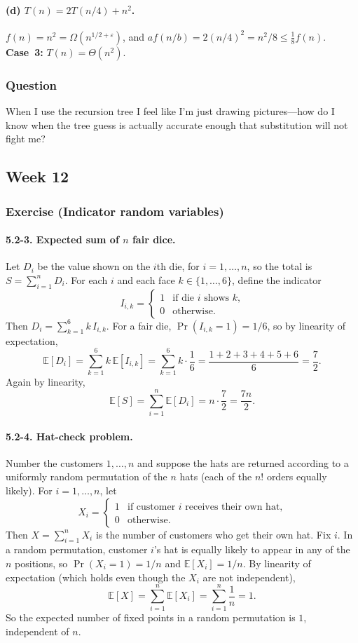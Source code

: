 \documentclass{article}
\theoremstyle{theorem}
\theoremstyle{definition}
\theoremstyle{remark}
\begin{document}
\paragraph{(d) $T(n)=2T(n/4)+n^2$.}
$f(n)=n^2=\Omega(n^{1/2+\varepsilon})$, and $af(n/b)=2(n/4)^2=n^2/8\le \tfrac18 f(n)$. \textbf{Case~3:} $T(n)=\Theta(n^2)$.

\subsubsection*{Question}
When I use the recursion tree I feel like I'm just drawing pictures---how do I know when the tree guess is actually accurate enough that substitution will not fight me?

\subsection{Week 12}\label{sec:week12}

\subsubsection*{Exercise (Indicator random variables)}

\paragraph{5.2-3. Expected sum of $n$ fair dice.}
Let $D_i$ be the value shown on the $i$th die, for $i=1,\ldots,n$, so the total is $S=\sum_{i=1}^n D_i$.
For each $i$ and each face $k\in\{1,\ldots,6\}$, define the indicator
\[
I_{i,k}=
\begin{cases}
1 & \text{if die $i$ shows $k$,}\\
0 & \text{otherwise.}
\end{cases}
\]
Then $D_i=\sum_{k=1}^6 k\,I_{i,k}$. For a fair die, $\Pr(I_{i,k}=1)=1/6$, so by linearity of expectation,
\[
\mathbb{E}[D_i]=\sum_{k=1}^6 k\,\mathbb{E}[I_{i,k}]
=\sum_{k=1}^6 k\cdot\frac{1}{6}
=\frac{1+2+3+4+5+6}{6}
=\frac{7}{2}.
\]
Again by linearity,
\[
\mathbb{E}[S]=\sum_{i=1}^n \mathbb{E}[D_i]=n\cdot\frac{7}{2}=\frac{7n}{2}.
\]

\paragraph{5.2-4. Hat-check problem.}
Number the customers $1,\ldots,n$ and suppose the hats are returned according to a uniformly random permutation of the $n$ hats (each of the $n!$ orders equally likely).
For $i=1,\ldots,n$, let
\[
X_i=
\begin{cases}
1 & \text{if customer $i$ receives their own hat,}\\
0 & \text{otherwise.}
\end{cases}
\]
Then $X=\sum_{i=1}^n X_i$ is the number of customers who get their own hat.
Fix $i$. In a random permutation, customer $i$'s hat is equally likely to appear in any of the $n$ positions, so $\Pr(X_i=1)=1/n$ and $\mathbb{E}[X_i]=1/n$.
By linearity of expectation (which holds even though the $X_i$ are not independent),
\[
\mathbb{E}[X]=\sum_{i=1}^n \mathbb{E}[X_i]=\sum_{i=1}^n \frac{1}{n}=1.
\]
So the expected number of fixed points in a random permutation is $1$, independent of $n$.
\end{document}
